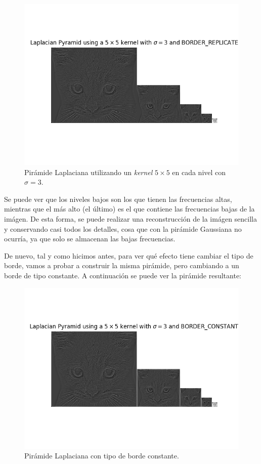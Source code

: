 \documentclass[11pt,a4paper]{article}
\begin{document}
\begin{figure}[H]
\centering
\includegraphics[scale=0.6]{img/lap-pyr-1.png}
\caption{Pirámide Laplaciana utilizando un \textit{kernel} $5 \times 5$ en cada nivel con $\sigma = 3$.}
\label{fig:lap-pyr-1}
\end{figure}

Se puede ver que los niveles bajos son los que tienen las frecuencias altas, mientras que el más alto (el último) es el
que contiene las frecuencias bajas de la imágen. De esta forma, se puede realizar una reconstrucción de la imágen sencilla
y conservando casi todos los detalles, cosa que con la pirámide Gaussiana no ocurría, ya que solo se almacenan las bajas
frecuencias.

De nuevo, tal y como hicimos antes, para ver qué efecto tiene cambiar el tipo de borde, vamos a probar a construir la misma
pirámide, pero cambiando a un borde de tipo constante. A continuación se puede ver la pirámide resultante:

\begin{figure}[H]
\centering
\includegraphics[scale=0.5]{img/lap-pyr-2.png}
\caption{Pirámide Laplaciana con tipo de borde constante.}
\label{fig:lap-pyr-2}
\end{figure}
\end{document}
